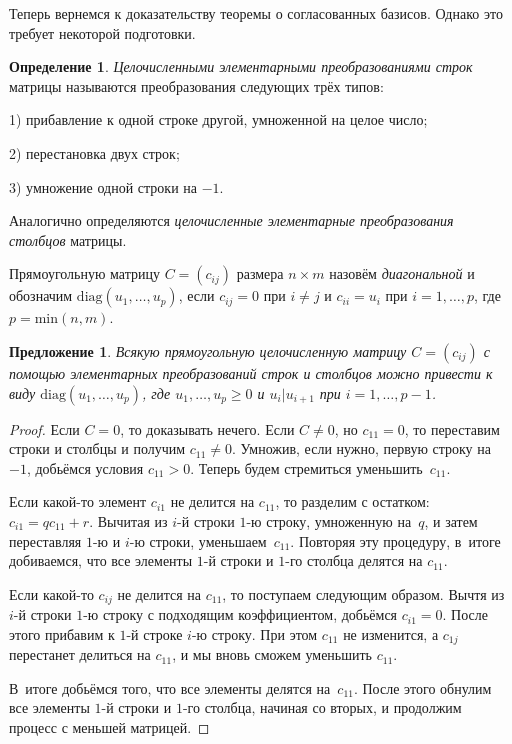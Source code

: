\documentclass[a4paper,10pt]{amsart}
\newtheorem{proposition}{Предложение}
\theoremstyle{definition}
\newtheorem{definition}{Определение}
\theoremstyle{remark}
\begin{document}
Теперь вернемся к доказательству теоремы о согласованных базисов.
Однако это требует некоторой подготовки.

\begin{definition}
{\it Целочисленными элементарными преобразованиями строк} матрицы
называются преобразования следующих трёх типов:

1) прибавление к одной строке другой, умноженной на целое число;

2) перестановка двух строк;

3) умножение одной строки на $-1$.

Аналогично определяются {\it целочисленные элементарные
преобразования столбцов} матрицы.
\end{definition}

Прямоугольную матрицу $C=(c_{ij})$ размера $n\times m$ назовём {\it
диагональной} и обозначим $\text{diag}(u_1,\ldots,u_p)$, если
$c_{ij}=0$ при $i\ne j$ и $c_{ii}=u_i$ при $i=1,\ldots,p$, где
$p=\text{min}(n,m)$.

\begin{proposition} \label{palg}
Всякую прямоугольную целочисленную матрицу $C=(c_{ij})$ с помощью
элементарных преобразований строк и столбцов можно привести к виду
$\text{diag}(u_1,\ldots,u_p)$, где $u_1,\ldots,u_p \geqslant 0$ и
$u_i|u_{i+1}$ при $i=1,\ldots,p-1$.
\end{proposition}

\begin{proof}
Если $C=0$, то доказывать нечего. Если $C\ne 0$, но $c_{11}=0$, то
переставим строки и столбцы и получим $c_{11}\ne 0$. Умножив, если
нужно, первую строку на $-1$, добьёмся условия $c_{11}>0$. Теперь
будем стремиться уменьшить~$c_{11}$.

Если какой-то элемент $c_{i1}$ не делится на $c_{11}$, то разделим с
остатком: $c_{i1}=qc_{11}+r$. Вычитая из $i$-й строки $1$-ю строку,
умноженную на~$q$, и затем переставляя $1$-ю и $i$-ю строки,
уменьшаем~$c_{11}$. Повторяя эту процедуру, в~итоге добиваемся, что
все элементы $1$-й строки и $1$-го столбца делятся на $c_{11}$.

Если какой-то $c_{ij}$ не делится на $c_{11}$, то поступаем
следующим образом. Вычтя из $i$-й строки $1$-ю строку с подходящим
коэффициентом, добьёмся $c_{i1}=0$. После этого прибавим к $1$-й
строке $i$-ю строку. При этом $c_{11}$ не изменится, а $c_{1j}$
перестанет делиться на $c_{11}$, и мы вновь сможем уменьшить
$c_{11}$.

В~итоге добьёмся того, что все элементы делятся на~$c_{11}$. После
этого обнулим все элементы $1$-й строки и $1$-го столбца, начиная со
вторых, и продолжим процесс с меньшей матрицей.
\end{proof}
\end{document}
